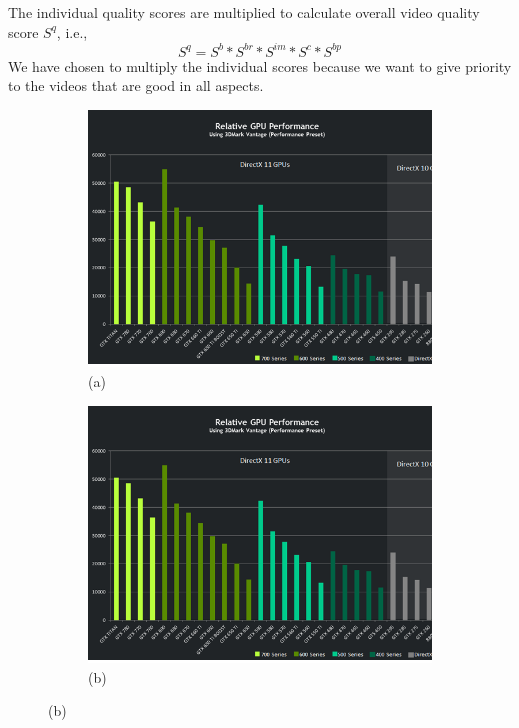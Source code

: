\documentclass{sig-alternate}
\begin{document}
The individual quality scores are multiplied to calculate overall video quality score $S^q$, i.e.,
\[
  S^q = S^b*S^{br}*S^{im}*S^c*S^{bp} 
\]
We have chosen to multiply the individual scores because we want to give priority to the videos that are good in all aspects.
\begin{figure}[t!]
  \centering
  \begin{subfigure}[b]{0.2\linewidth}
    \includegraphics[width=\linewidth]{Performance.png}
    \caption{(a)}
  \end{subfigure}
  \begin{subfigure}[b]{0.2\linewidth}
    \includegraphics[width=\linewidth]{Performance.png}
    \caption{(b)}
  \end{subfigure}

\end{figure}
\end{document}
